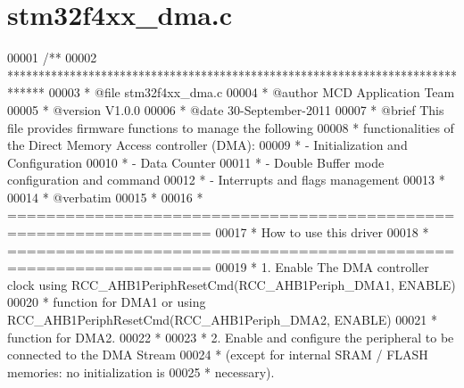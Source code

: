 \section{stm32f4xx\+\_\+dma.\+c}
\label{stm32f4xx__dma_8c_source}

\begin{DoxyCode}
00001 \textcolor{comment}{/**}
00002 \textcolor{comment}{  ******************************************************************************}
00003 \textcolor{comment}{  * @file    stm32f4xx\_dma.c}
00004 \textcolor{comment}{  * @author  MCD Application Team}
00005 \textcolor{comment}{  * @version V1.0.0}
00006 \textcolor{comment}{  * @date    30-September-2011}
00007 \textcolor{comment}{  * @brief   This file provides firmware functions to manage the following }
00008 \textcolor{comment}{  *          functionalities of the Direct Memory Access controller (DMA):           }
00009 \textcolor{comment}{  *           - Initialization and Configuration}
00010 \textcolor{comment}{  *           - Data Counter}
00011 \textcolor{comment}{  *           - Double Buffer mode configuration and command  }
00012 \textcolor{comment}{  *           - Interrupts and flags management}
00013 \textcolor{comment}{  *           }
00014 \textcolor{comment}{  *  @verbatim}
00015 \textcolor{comment}{  *      }
00016 \textcolor{comment}{  *          ===================================================================      }
00017 \textcolor{comment}{  *                                 How to use this driver}
00018 \textcolor{comment}{  *          =================================================================== }
00019 \textcolor{comment}{  *          1. Enable The DMA controller clock using RCC\_AHB1PeriphResetCmd(RCC\_AHB1Periph\_DMA1,
       ENABLE)}
00020 \textcolor{comment}{  *             function for DMA1 or using RCC\_AHB1PeriphResetCmd(RCC\_AHB1Periph\_DMA2, ENABLE)}
00021 \textcolor{comment}{  *             function for DMA2.}
00022 \textcolor{comment}{  *}
00023 \textcolor{comment}{  *          2. Enable and configure the peripheral to be connected to the DMA Stream}
00024 \textcolor{comment}{  *             (except for internal SRAM / FLASH memories: no initialization is }
00025 \textcolor{comment}{  *             necessary). }

\end{DoxyCode}
